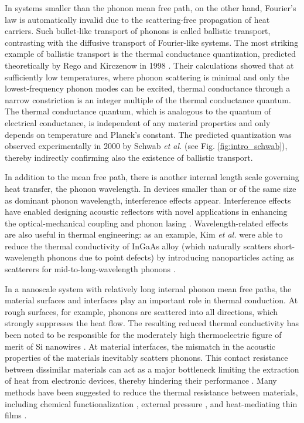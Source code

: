 In systems smaller than the phonon mean free path, on the other hand, Fourier's law is automatically invalid due to the scattering-free propagation of heat carriers. Such bullet-like transport of phonons is called ballistic transport, contrasting with the diffusive transport of Fourier-like systems. The most striking example of ballistic transport is the thermal conductance quantization, predicted theoretically by Rego and Kirczenow in 1998 \cite{rego98}. Their calculations showed that at sufficiently low temperatures, where phonon scattering is minimal and only the lowest-frequency phonon modes can be excited, thermal conductance through a narrow constriction is an integer multiple of the thermal conductance quantum. The thermal conductance quantum, which is analogous to the quantum of electrical conductance, is independent of any material properties and only depends on temperature and Planck's constant. The predicted quantization was observed experimentally in 2000 by Schwab \textit{et al.} \cite{schwab00} (see Fig. \ref{fig:intro_schwab}), thereby indirectly confirming also the existence of ballistic transport.

In addition to the mean free path, there is another internal length scale governing heat transfer, the phonon wavelength. In devices smaller than or of the same size as dominant phonon wavelength, interference effects appear. Interference effects have enabled designing acoustic reflectors with novel applications in enhancing the optical-mechanical coupling \cite{fainstein13} and phonon lasing \cite{maryam13}. Wavelength-related effects are also useful in thermal engineering: as an example, Kim \textit{et al.} were able to reduce the thermal conductivity of InGaAs alloy (which naturally scatters short-wavelength phonons due to point defects) by introducing nanoparticles acting as scatterers for mid-to-long-wavelength phonons \cite{kim06}. %

In a nanoscale system with relatively long internal phonon mean free paths, the material surfaces and interfaces play an important role in thermal conduction. At rough surfaces, for example, phonons are scattered into all directions, which strongly suppresses the heat flow. The resulting reduced thermal conductivity has been noted to be responsible for the moderately high thermoelectric figure of merit of Si nanowires \cite{hochbaum08}. At material interfaces, the mismatch in the acoustic properties of the materials inevitably scatters phonons.  This contact resistance between dissimilar materials can act as a major bottleneck limiting the extraction of heat from electronic devices, thereby hindering their performance \cite{pop10}. Many methods have been suggested to reduce the thermal resistance between materials, including chemical functionalization \cite{hopkins11,kaur14}, external pressure \cite{shen11,chalopin12}, and heat-mediating thin films \cite{english12}. %

